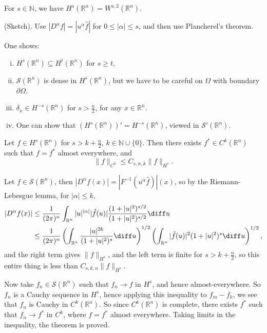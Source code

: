 \documentclass[12pt]{article}
\begin{document}
\begin{proposition}
	For $s \in \mathbb{N}$, we have $H^s(\mathbb{R}^n) = W^{s, 2}(\mathbb{R}^n)$.
\end{proposition}

\begin{proofbox}
	(Sketch). Use $|D^\alpha f| = |u^\alpha \hat f|$ for $0 \leq |\alpha| \leq s$, and then use Plancherel's theorem.
\end{proofbox}

One shows:
\begin{enumerate}[(i)]
	\item $H^s(\mathbb{R}^n) \subseteq H^t(\mathbb{R}^n)$ for $s \geq t$,
	\item $\mathcal{S}(\mathbb{R}^n)$ is dense in $H^s(\mathbb{R}^n)$, but we have to be careful on $\Omega$ with boundary $\partial \Omega$.
	\item $\delta_x \in H^{-s}(\mathbb{R}^n)$ for $s > \frac{n}{2}$, for any $x \in \mathbb{R}^n$.
	\item One can show that $(H^s(\mathbb{R}^n))' = H^{-s}(\mathbb{R}^n)$, viewed in $\mathcal{S}'(\mathbb{R}^n)$.
\end{enumerate}

\begin{theorem}
	Let $f \in H^s(\mathbb{R}^n)$ for $s > k + \frac{n}{2}$, $k \in \mathbb{N} \cup \{0\}$. Then there exists $f^\ast \in C^k(\mathbb{R}^n)$ such that $f = f^\ast$ almost everywhere, and
	\[
	\|f\|_{C^k} \leq C_{s, n ,k} \|f\|_{H^s}.
	\]
\end{theorem}

\begin{proofbox}
	Let $f \in \mathcal{S}(\mathbb{R}^n)$, then $|D^\alpha f(x)| = |F^{-1} (u^\alpha \hat f)|(x)$, so by the Riemann-Lebesgue lemma, for $|\alpha| \leq k$,
	\begin{align*}
		|D^\alpha f(x)| &\leq \frac{1}{(2 \pi)^n} \int_{\mathbb{R}^n} |u|^{|\alpha|} |\hat f(u)| \frac{(1 + |u|^2)^{s/2}}{(1 + |u|^2)^{s/2}} \diff u \\
				& \leq \frac{1}{(2 \pi)^n} \left( \int_{\mathbb{R}^n} \frac{|u|^{2k}}{(1 + |u|^2)^s} \diff u \right)^{1/2} \left( \int_{\mathbb{R}^n} |\hat f(u)|^2 (1 + |u|^2)^{s} \diff u \right)^{1/2},
	\end{align*}
	and the right term gives $\|f\|_{H^s}$, and the left term is finite for $s > k + \frac{n}{2}$, so this entire thing is less than $C_{s, k, n} \|f\|_{H^s}$.

	Now take $f_n \in \mathcal{S}(\mathbb{R}^n)$ such that $f_n \to f$ in $H^s$, and hence almost-everywhere. So $f_n$ is a Cauchy sequence in $H^s$, hence applying this inequality to $f_m - f_k$, we see that $f_n$ is Cauchy in $C^k(\mathbb{R}^n)$. So since $C^k(\mathbb{R}^n)$ is complete, there exists $f^\ast$ such that $f_n \to f^{\ast}$ in $C^k$, where $f = f^\ast$ almost everywhere. Taking limits in the inequality, the theorem is proved.
\end{proofbox}
\end{document}
